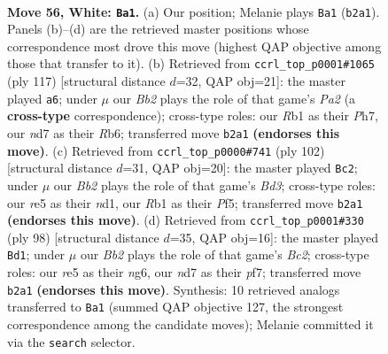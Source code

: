 \documentclass[11pt]{article}
\begin{document}
\clearpage

\begin{figure}[p]\centering
\begin{subfigure}{0.46\textwidth}\centering
\resizebox{\linewidth}{!}{%
\newchessgame
\chessboard[
  setfen={7k/3n4/6P1/4r3/p1p3K1/P1P4p/1BP4P/1R6 w - - 1 56},
  showmover=false,
  pgfstyle=straightmove, color=movearrow, markmove={b2-a1}
]}
\caption{}
\end{subfigure}\hfill
\begin{subfigure}{0.46\textwidth}\centering
\resizebox{\linewidth}{!}{%
\newchessgame
\chessboard[
  setfen={8/p3Pk1p/1r6/1bp4p/2p2P2/2P2NK1/R7/8 b - - 2 59},
  showmover=false,
  pgfstyle=straightmove, color=movearrow, markmove={a7-a6}
]}
\caption{}
\end{subfigure}
\\[4pt]
\begin{subfigure}{0.46\textwidth}\centering
\resizebox{\linewidth}{!}{%
\newchessgame
\chessboard[
  setfen={8/1p2k3/2p1P3/p4P2/2P5/P2B2Kp/8/3n4 w - - 5 52},
  showmover=false,
  pgfstyle=straightmove, color=movearrow, markmove={d3-c2}
]}
\caption{}
\end{subfigure}\hfill
\begin{subfigure}{0.46\textwidth}\centering
\resizebox{\linewidth}{!}{%
\newchessgame
\chessboard[
  setfen={2r5/1RP2p2/6nk/1p2p3/1Pp1P1P1/2P5/2B3K1/8 w - - 0 50},
  showmover=false,
  pgfstyle=straightmove, color=movearrow, markmove={c2-d1}
]}
\caption{}
\end{subfigure}
\caption{\textbf{Move 56, White: \texttt{Ba1}.} (a) Our position; Melanie plays \texttt{Ba1} (\texttt{b2a1}). Panels (b)--(d) are the retrieved master positions whose correspondence most drove this move (highest QAP objective among those that transfer to it). (b) Retrieved from \texttt{ccrl\_top\_p0001\#1065} (ply 117) [structural distance $d$=32, QAP obj=21]: the master played \texttt{a6}; under $\mu$ our \emph{Bb2} plays the role of that game's \emph{Pa2} (a \textbf{cross-type} correspondence); cross-type roles: our \emph{R}b1 as their \emph{P}h7, our \emph{n}d7 as their \emph{R}b6; transferred move \texttt{b2a1} \textbf{(endorses this move)}. (c) Retrieved from \texttt{ccrl\_top\_p0000\#741} (ply 102) [structural distance $d$=31, QAP obj=20]: the master played \texttt{Bc2}; under $\mu$ our \emph{Bb2} plays the role of that game's \emph{Bd3}; cross-type roles: our \emph{r}e5 as their \emph{n}d1, our \emph{R}b1 as their \emph{P}f5; transferred move \texttt{b2a1} \textbf{(endorses this move)}. (d) Retrieved from \texttt{ccrl\_top\_p0001\#330} (ply 98) [structural distance $d$=35, QAP obj=16]: the master played \texttt{Bd1}; under $\mu$ our \emph{Bb2} plays the role of that game's \emph{Bc2}; cross-type roles: our \emph{r}e5 as their \emph{n}g6, our \emph{n}d7 as their \emph{p}f7; transferred move \texttt{b2a1} \textbf{(endorses this move)}. Synthesis: 10 retrieved analogs transferred to \texttt{Ba1} (summed QAP objective 127, the strongest correspondence among the candidate moves); Melanie committed it via the \texttt{search} selector.}
\label{fig:thought-m110}
\end{figure}
\end{document}
